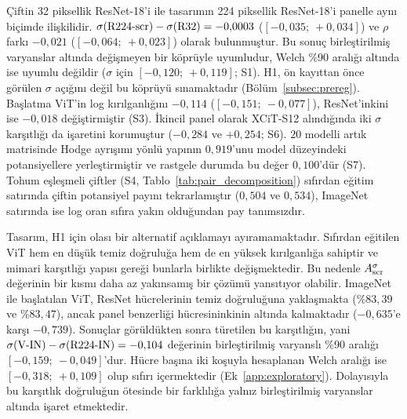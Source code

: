 Çiftin 32 piksellik ResNet-18'i ile tasarımın 224 piksellik ResNet-18'i panelle aynı biçimde ilişkilidir. $\sigma(\mbox{R224-scr}) - \sigma(\mbox{R32}) = -0{,}0003$ ($[-0{,}035;\ +0{,}034]$) ve $\rho$ farkı $-0{,}021$ ($[-0{,}064;\ +0{,}023]$) olarak bulunmuştur. Bu sonuç birleştirilmiş varyanslar altında değişmeyen bir köprüyle uyumludur, Welch \%90 aralığı altında ise uyumlu değildir ($\sigma$ için $[-0{,}120;\ +0{,}119]$; S1). H1, ön kayıttan önce görülen $\sigma$ açığını değil bu köprüyü sınamaktadır (Bölüm~\ref{subsec:prereg}). Başlatma ViT'in log kırılganlığını $-0{,}114$ ($[-0{,}151;\ -0{,}077]$), ResNet'inkini ise $-0{,}018$ değiştirmiştir (S3). İkincil panel olarak XCiT-S12 alındığında iki $\sigma$ karşıtlığı da işaretini korumuştur ($-0{,}284$ ve $+0{,}254$; S6). $20$ modelli artık matrisinde Hodge ayrışımı yönlü yapının $0{,}919$'unu model düzeyindeki potansiyellere yerleştirmiştir ve rastgele durumda bu değer $0{,}100$'dür (S7). Tohum eşleşmeli çiftler (S4, Tablo~\ref{tab:pair_decomposition}) sıfırdan eğitim satırında çiftin potansiyel payını tekrarlamıştır ($0{,}504$ ve $0{,}534$), ImageNet satırında ise log oran sıfıra yakın olduğundan pay tanımsızdır.

Tasarım, H1 için olası bir alternatif açıklamayı ayıramamaktadır. Sıfırdan eğitilen ViT hem en düşük temiz doğruluğa hem de en yüksek kırılganlığa sahiptir ve mimari karşıtlığı yapısı gereği bunlarla birlikte değişmektedir. Bu nedenle $A^{\sigma}_{\mathrm{scr}}$ değerinin bir kısmı daha az yakınsamış bir çözümü yansıtıyor olabilir. ImageNet ile başlatılan ViT, ResNet hücrelerinin temiz doğruluğuna yaklaşmakta ($\%83{,}39$ ve $\%83{,}47$), ancak panel benzerliği  hücresininkinin altında kalmaktadır ($-0{,}635$'e karşı $-0{,}739$). Sonuçlar görüldükten sonra türetilen bu karşıtlığın, yani $\sigma(\mbox{V-IN}) - \sigma(\mbox{R224-IN}) = -0{,}104$ değerinin birleştirilmiş varyanslı \%90 aralığı $[-0{,}159;\ -0{,}049]$'dur. Hücre başına iki koşuyla hesaplanan Welch aralığı ise $[-0{,}318;\ +0{,}109]$ olup sıfırı içermektedir (Ek~\ref{app:exploratory}). Dolayısıyla bu karşıtlık doğruluğun ötesinde bir farklılığa yalnız birleştirilmiş varyanslar altında işaret etmektedir.

